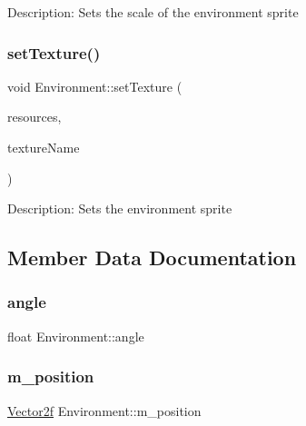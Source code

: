 Description\+: Sets the scale of the environment sprite \mbox{\label{class_environment_a55ae46ea23667b1fc4de6bdc0935107e}} 
\subsubsection{\texorpdfstring{setTexture()}{setTexture()}}
{\footnotesize\ttfamily void Environment\+::set\+Texture (\begin{DoxyParamCaption}\item[{\mbox{\hyperlink{class_resource_manager}{Resource\+Manager}} \&}]{resources,  }\item[{std\+::string}]{texture\+Name }\end{DoxyParamCaption})}

Description\+: Sets the environment sprite 

\subsection{Member Data Documentation}
\mbox{\label{class_environment_af506dbb19e1fb357a88221c510d4e834}} 
\subsubsection{\texorpdfstring{angle}{angle}}
{\footnotesize\ttfamily float Environment\+::angle}

\mbox{\label{class_environment_ac08b227b88843515dae0938715ddfd1e}} 
\subsubsection{\texorpdfstring{m\_position}{m\_position}}
{\footnotesize\ttfamily \mbox{\hyperlink{class_vector2f}{Vector2f}} Environment\+::m\+\_\+position}

\mbox{\label{class_environment_aea118013b2fe6baf3546bcce8c47bf79}} 
